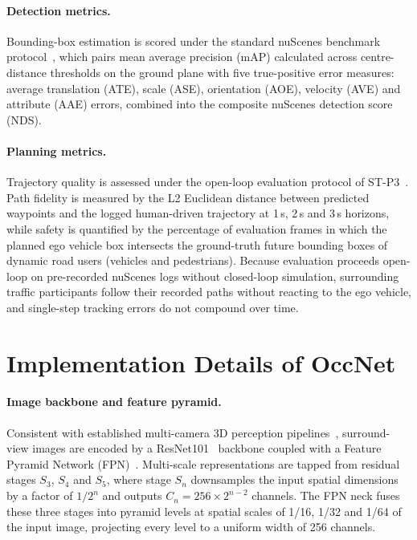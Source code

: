 \paragraph{Detection metrics.} Bounding-box estimation is scored under the standard nuScenes benchmark protocol~\cite{caesar2020nuscenes}, which pairs mean average precision (mAP) calculated across centre-distance thresholds on the ground plane with five true-positive error measures: average translation (ATE), scale (ASE), orientation (AOE), velocity (AVE) and attribute (AAE) errors, combined into the composite nuScenes detection score (NDS).

\paragraph{Planning metrics.} Trajectory quality is assessed under the open-loop evaluation protocol of ST-P3~\cite{hu2022stp3}. Path fidelity is measured by the L2 Euclidean distance between predicted waypoints and the logged human-driven trajectory at 1\,s, 2\,s and 3\,s horizons, while safety is quantified by the percentage of evaluation frames in which the planned ego vehicle box intersects the ground-truth future bounding boxes of dynamic road users (vehicles and pedestrians). Because evaluation proceeds open-loop on pre-recorded nuScenes logs without closed-loop simulation, surrounding traffic participants follow their recorded paths without reacting to the ego vehicle, and single-step tracking errors do not compound over time.

\section{Implementation Details of OccNet}\label{occnet:app:implementation}

\paragraph{Image backbone and feature pyramid.} Consistent with established multi-camera 3D perception pipelines~\cite{li2022bevformer,wang2021fcos3d}, surround-view images are encoded by a ResNet101~\cite{he2016deep} backbone coupled with a Feature Pyramid Network (FPN)~\cite{lin2017feature}. Multi-scale representations are tapped from residual stages $S_3$, $S_4$ and $S_5$, where stage $S_n$ downsamples the input spatial dimensions by a factor of $1/2^n$ and outputs $C_n=256\times2^{n-2}$ channels. The FPN neck fuses these three stages into pyramid levels at spatial scales of 1/16, 1/32 and 1/64 of the input image, projecting every level to a uniform width of 256 channels.

